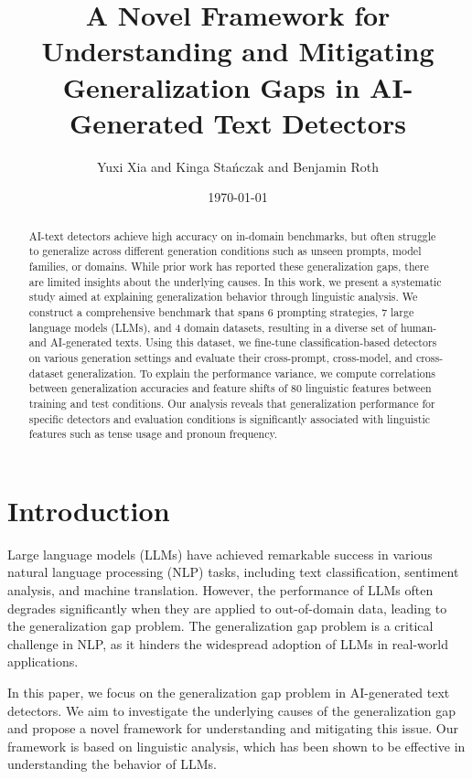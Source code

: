 \documentclass{article}
\begin{document}
\title{A Novel Framework for Understanding and Mitigating Generalization Gaps in AI-Generated Text Detectors}
\author{Yuxi Xia and Kinga Stańczak and Benjamin Roth}
\date{\today}

\maketitle

\begin{abstract}
AI-text detectors achieve high accuracy on in-domain benchmarks, but often struggle to generalize across different generation conditions such as unseen prompts, model families, or domains. While prior work has reported these generalization gaps, there are limited insights about the underlying causes. In this work, we present a systematic study aimed at explaining generalization behavior through linguistic analysis. We construct a comprehensive benchmark that spans 6 prompting strategies, 7 large language models (LLMs), and 4 domain datasets, resulting in a diverse set of human- and AI-generated texts. Using this dataset, we fine-tune classification-based detectors on various generation settings and evaluate their cross-prompt, cross-model, and cross-dataset generalization. To explain the performance variance, we compute correlations between generalization accuracies and feature shifts of 80 linguistic features between training and test conditions. Our analysis reveals that generalization performance for specific detectors and evaluation conditions is significantly associated with linguistic features such as tense usage and pronoun frequency.
\end{abstract}

\section{Introduction}

Large language models (LLMs) have achieved remarkable success in various natural language processing (NLP) tasks, including text classification, sentiment analysis, and machine translation. However, the performance of LLMs often degrades significantly when they are applied to out-of-domain data, leading to the generalization gap problem. The generalization gap problem is a critical challenge in NLP, as it hinders the widespread adoption of LLMs in real-world applications.

In this paper, we focus on the generalization gap problem in AI-generated text detectors. We aim to investigate the underlying causes of the generalization gap and propose a novel framework for understanding and mitigating this issue. Our framework is based on linguistic analysis, which has been shown to be effective in understanding the behavior of LLMs.
\end{document}
